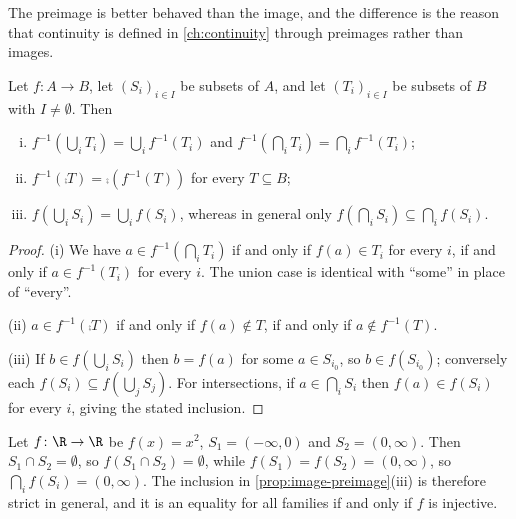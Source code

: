 The preimage is better behaved than the image, and the difference is the reason
that continuity is defined in \autoref{ch:continuity} through preimages rather
than images.

\begin{proposition}\label{prop:image-preimage}
	Let $f\colon A\to B$, let $(S_i)_{i\in I}$ be subsets of $A$, and let
	$(T_i)_{i\in I}$ be subsets of $B$ with $I\neq\emptyset$. Then
	\begin{enumerate}[(i)]
		\item $f^{-1}\!\left(\bigcup_i T_i\right)=\bigcup_i f^{-1}(T_i)$ and
		      $f^{-1}\!\left(\bigcap_i T_i\right)=\bigcap_i f^{-1}(T_i)$;
		\item $f^{-1}(\comp{T})=\comp{\left(f^{-1}(T)\right)}$ for every $T\subseteq B$;
		\item $f\!\left(\bigcup_i S_i\right)=\bigcup_i f(S_i)$, whereas in general only
		      $f\!\left(\bigcap_i S_i\right)\subseteq\bigcap_i f(S_i)$.
	\end{enumerate}
\end{proposition}

\begin{proof}
	(i) We have $a\in f^{-1}\!\left(\bigcap_i T_i\right)$ if and only if
	$f(a)\in T_i$ for every $i$, if and only if $a\in f^{-1}(T_i)$ for every $i$.
	The union case is identical with ``some'' in place of ``every''.

	(ii) $a\in f^{-1}(\comp{T})$ if and only if $f(a)\notin T$, if and only if
	$a\notin f^{-1}(T)$.

	(iii) If $b\in f\!\left(\bigcup_i S_i\right)$ then $b=f(a)$ for some
	$a\in S_{i_0}$, so $b\in f(S_{i_0})$; conversely each $f(S_i)\subseteq
		f\!\left(\bigcup_j S_j\right)$. For intersections, if $a\in\bigcap_i S_i$ then
	$f(a)\in f(S_i)$ for every $i$, giving the stated inclusion.
\end{proof}

\begin{eg}\label{eg:image-intersection}
	Let $f\colon\R\to\R$ be $f(x)=x^2$, $S_1=(-\infty,0)$ and $S_2=(0,\infty)$. Then
	$S_1\cap S_2=\emptyset$, so $f(S_1\cap S_2)=\emptyset$, while
	$f(S_1)=f(S_2)=(0,\infty)$, so $\bigcap_i f(S_i)=(0,\infty)$. The inclusion in
	\autoref{prop:image-preimage}(iii) is therefore strict in general, and it is an
	equality for all families if and only if $f$ is injective.
\end{eg}

